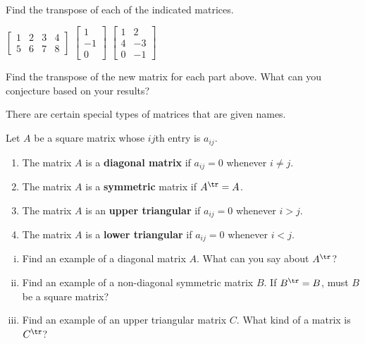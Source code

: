 \begin{activity} \label{act:A2.1_4} ~
    \ba
    \item Find the transpose of each of the indicated matrices.

$\!\!\!\!\!\!\! \left[ \begin{array}{cccc}
1 & 2   & 3   & 4   \\
5 & 6  & 7   & 8
\end{array} \right]$ \hspace{1cm} $\left[ \begin{array}{r}
1 \\ -1  \\ 0 \end{array} \right]$ \hspace{1cm} $\left[ \begin{array}{cr}
1 &2 \\ 4 & -3 \\ 0 &-1 \end{array} \right]$ 

    

\item Find the transpose of the new matrix for each part above. What can you conjecture based on your results?

 There are certain special types of matrices that are given names. 

   \ea
\begin{definition} \label{def:special_matrices} Let $A$ be a square matrix whose $ij$th entry is $a_{ij}$. 
	\begin{enumerate}
	\item The matrix $A$ is a \textbf{diagonal matrix} if $a_{ij} = 0$ whenever $i \neq j$.
	\item The matrix $A$ is a \textbf{symmetric} matrix if $A^{\tr} = A$.
	\item The matrix $A$ is an \textbf{upper triangular} if $a_{ij} = 0$ whenever $i > j$.
	\item The matrix $A$ is a \textbf{lower triangular} if $a_{ij} = 0$ whenever $i < j$.
	\end{enumerate}
\end{definition}
	\begin{enumerate}[i.]
	\item Find an example of a diagonal matrix $A$. What can you say about $A^{\tr}$? 
	\item Find an example of a non-diagonal symmetric matrix $B$. If $B^{\tr} = B$, must $B$ be a square matrix?  
	\item Find an example of an upper triangular matrix $C$. What kind of a matrix is $C^{\tr}$? 
	\end{enumerate}
	
\end{activity}


